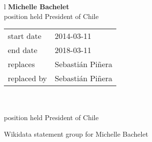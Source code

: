 
\begin{figure}[tb]
\centering
{\sf
\begin{tabular}{l}
\large\textbf{Michelle Bachelet}\\[1ex]
\large\qquad position held \quad President of Chile\\
\qquad \qquad 
{\begin{tabular}{l@{\qquad~~}l}
start date \wid{P580} & 2014-03-11\\
end date \wid{P582} 	& 2018-03-11\\
replaces\wid{P155}	& Sebastián Piñera\wid{Q306}\\
replaced by\wid{P156} & Sebastián Piñera\wid{Q306}\\
\end{tabular}}\\
\\[-1ex]
\large\qquad position held \quad President of Chile\\
\qquad {}
\end{tabular}
}
\caption{Wikidata statement group for Michelle Bachelet \label{fig:mb}}
\end{figure}




